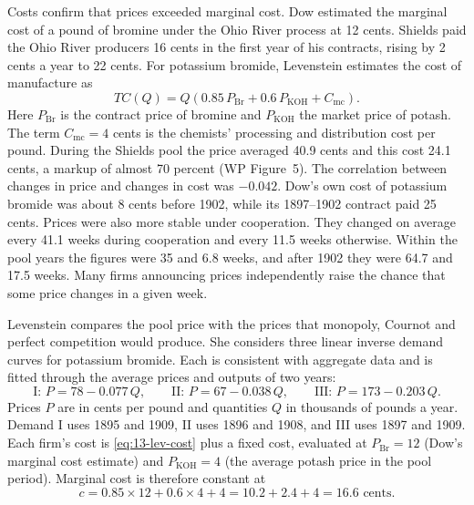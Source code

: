 Costs confirm that prices exceeded marginal cost. Dow estimated the marginal cost of a pound of bromine under the
Ohio River process at 12 cents. Shields paid the Ohio River producers 16 cents in the first year of his contracts,
rising by 2 cents a year to 22 cents. For potassium bromide, Levenstein estimates the cost of manufacture as
\begin{equation}\label{eq:13-lev-cost}
  TC(Q) = Q\left(0.85\,P_{\mathrm{Br}} + 0.6\,P_{\mathrm{KOH}} + C_{\mathrm{mc}}\right).
\end{equation}
Here $P_{\mathrm{Br}}$ is the contract price of bromine and $P_{\mathrm{KOH}}$ the market price of potash. The
term $C_{\mathrm{mc}} = 4$ cents is the chemists' processing and distribution cost per pound. During the Shields pool the
price averaged 40.9 cents and this cost 24.1 cents, a markup of almost 70 percent (WP Figure~5). The correlation
between changes in price and changes in cost was $-0.042$. Dow's own cost of potassium bromide was about 8 cents
before 1902, while its 1897--1902 contract paid 25 cents. Prices were also more stable under cooperation.
They changed on average every 41.1 weeks during cooperation and every 11.5 weeks otherwise. Within the pool years
the figures were 35 and 6.8 weeks, and after 1902 they were 64.7 and 17.5 weeks. Many firms announcing prices
independently raise the chance that some price changes in a given week.

Levenstein compares the pool price with the prices that monopoly, Cournot and perfect competition would produce.
She considers three linear inverse demand curves for potassium bromide. Each is consistent with aggregate data
and is fitted through the average prices and outputs of two years:
\begin{equation}\label{eq:13-lev-demand}
  \text{I: } P = 78 - 0.077\,Q, \qquad
  \text{II: } P = 67 - 0.038\,Q, \qquad
  \text{III: } P = 173 - 0.203\,Q .
\end{equation}
Prices $P$ are in cents per pound and quantities $Q$ in thousands of pounds a year. Demand I uses 1895 and 1909, II uses 1896 and
1908, and III uses 1897 and 1909. Each firm's cost is \eqref{eq:13-lev-cost} plus a fixed cost, evaluated at
$P_{\mathrm{Br}} = 12$ (Dow's marginal cost estimate) and $P_{\mathrm{KOH}} = 4$ (the average potash price in the
pool period). Marginal cost is therefore constant at
\begin{equation}\label{eq:13-lev-mc}
  c = 0.85 \times 12 + 0.6 \times 4 + 4 = 10.2 + 2.4 + 4 = 16.6 \text{ cents.}
\end{equation}


